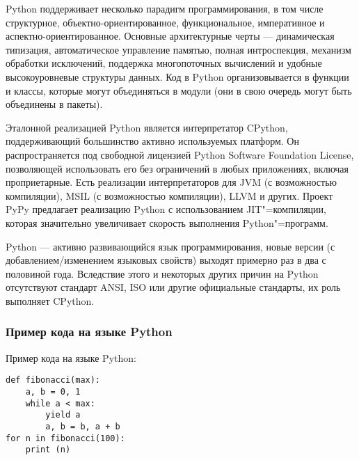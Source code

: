 \documentclass[14pt]{beamer}
\begin{document}
\begin{frame}[shrink=10]
\begin{block}

Python поддерживает несколько парадигм программирования, в том числе структурное, объектно-ориентированное, функциональное, императивное и аспектно-ориентированное. Основные архитектурные черты — динамическая типизация, автоматическое управление памятью, полная интроспекция, механизм обработки исключений, поддержка многопоточных вычислений и удобные высокоуровневые структуры данных. Код в Python организовывается в функции и классы, которые могут объединяться в модули (они в свою очередь могут быть объединены в пакеты).
\end{block}
\end{frame}

\begin{frame}[shrink=10]
\begin{block}{}
Эталонной реализацией Python является интерпретатор CPython, поддерживающий большинство активно используемых платформ. Он распространяется под свободной лицензией Python Software Foundation License, позволяющей использовать его без ограничений в любых приложениях, включая проприетарные. Есть реализации интерпретаторов для JVM (с возможностью компиляции), MSIL (с возможностью компиляции), LLVM и других. Проект PyPy предлагает реализацию Python с использованием JIT"=компиляции, которая значительно увеличивает скорость выполнения Python"=программ.
\end{block}
\end{frame}

\begin{frame}
\begin{block}

Python — активно развивающийся язык программирования, новые версии (с добавлением/изменением языковых свойств) выходят примерно раз в два с половиной года. Вследствие этого и некоторых других причин на Python отсутствуют стандарт ANSI, ISO или другие официальные стандарты, их роль выполняет CPython.
\end{block}
\end{frame}

{\subsubsection{Пример кода на языке Python}

\begin{frame}[fragile]
\begin{block}{Пример кода на языке Python:}
\begin{lstlisting}
def fibonacci(max):        
    a, b = 0, 1
    while a < max:
        yield a            
        a, b = b, a + b    
for n in fibonacci(100):   
    print (n)
\end{lstlisting}
\end{block}

\begin{center}
\hyperlink{menu}{}
\end{center}
\end{frame}
}
\end{document}
